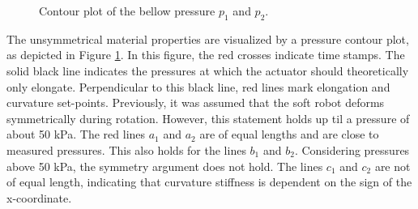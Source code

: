 \begin{figure}[H]
\begin{minipage}[b]{0.49\linewidth}
    \caption{Contour plot of the bellow pressure $p_1$ and $p_2$.}
    \label{fig5:pressureellips}
    \end{minipage} 
\end{figure}

The unsymmetrical material properties are visualized by a pressure contour plot, as depicted in Figure \ref{fig5:pressureellips}. In this figure, the red crosses indicate time stamps. The solid black line indicates the pressures at which the actuator should theoretically only elongate. Perpendicular to this black line, red lines mark elongation and curvature set-points. Previously, it was assumed that the soft robot deforms symmetrically during rotation. However, this statement holds up til a pressure of about 50 kPa. The red lines $a_1$ and $a_2$ are of equal lengths and are close to measured pressures. This also holds for the lines $b_1$ and $b_2$. Considering pressures above 50 kPa, the symmetry argument does not hold. The lines $c_1$ and $c_2$ are not of equal length, indicating that curvature stiffness is dependent on the sign of the x-coordinate. 






















